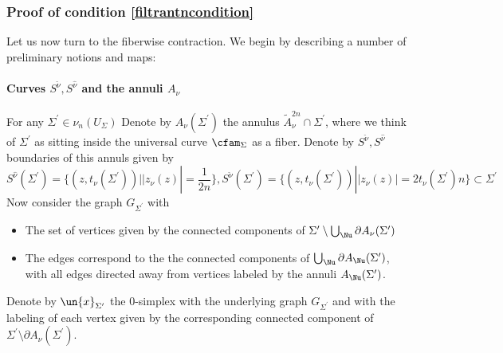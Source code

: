 \documentclass[a4paper,10pt]{amsart}
\begin{document}
\subsubsection{Proof of  condition \eqref{filtrantncondition}}\label{prfcondfiltrtop}
Let us now turn to the fiberwise contraction. We begin by describing a number of preliminary notions and maps:
	\paragraph{\textbf{Curves $S^{\check{\nu}}, S^{\hat{\nu}}$ and the annuli $A_{\nu}$}}\label{curveannuluspara}
For any $\Sigma^{\prime} \in \nu_n(U_{\Sigma})$
Denote by $A_{\nu}(\Sigma^\prime)$ the annulus $ \widetilde{A}^{2n}_{\nu} \cap \Sigma^\prime$, where we think of $\Sigma^\prime$ as sitting inside the universal curve $\cfam_{\Sigma}$ as a fiber. Denote by $S^{\check{\nu}}, S^{\hat{\nu}}$ boundaries of this annuls given by 
\[ S^{\hat{\nu}}(\Sigma^{\prime}) = \{(z,t_{\nu}(\Sigma^{\prime})) | |z_{\nu}(z)| = \frac{1}{2n} \} , S^{\check{\nu}}(\Sigma^{\prime}) = \{(z,t_{\nu}(\Sigma^{\prime})) | |z_{\nu}(z)| =2 t_{\nu}(\Sigma^{\prime}) n \} \subset \Sigma^{\prime}\]
Now consider the graph $G_{\Sigma^{\prime}}$ with 
\begin{itemize}
	\item The set of vertices given by the connected components of $\Sigma^{\prime} \setminus \bigcup_{\Nu} \partial A_{\nu}(\Sigma^{\prime})$
	\item The edges correspond to the the connected components of $\bigcup_{\Nu} \partial A_{\Nu}(\Sigma^{\prime})$, with all edges directed away from vertices labeled by the annuli $A_{\Nu}(\Sigma^{\prime})$.
\end{itemize}
Denote by $\un{x}_{\Sigma^{\prime}}$ the $0$-simplex with the underlying graph $G_{\Sigma^\prime}$ and with the labeling of each vertex given by the corresponding connected component of $\Sigma^{\prime} \setminus \partial A_{\nu}(\Sigma^{\prime})$. 
\end{document}

